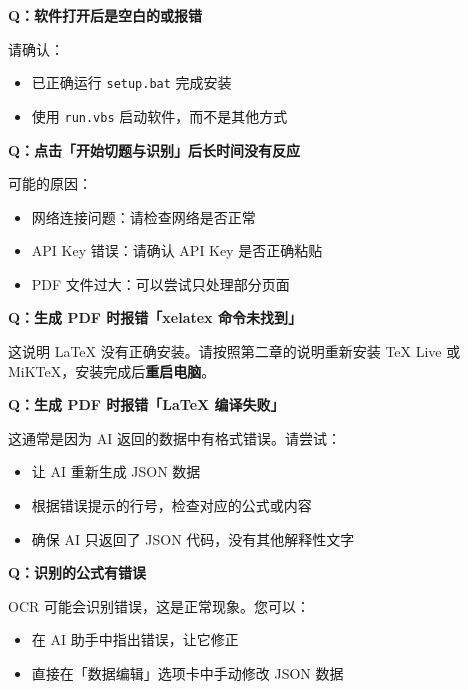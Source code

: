 \documentclass[UTF8,zihao=-4,openany]{ctexbook}
\begin{document}
\begin{QABox}
	\textbf{Q：软件打开后是空白的或报错}

	请确认：
	\begin{itemize}
		\item 已正确运行 \texttt{setup.bat} 完成安装
		\item 使用 \texttt{run.vbs} 启动软件，而不是其他方式
	\end{itemize}
\end{QABox}

\begin{QABox}
	\textbf{Q：点击「开始切题与识别」后长时间没有反应}

	可能的原因：
	\begin{itemize}
		\item 网络连接问题：请检查网络是否正常
		\item API Key 错误：请确认 API Key 是否正确粘贴
		\item PDF 文件过大：可以尝试只处理部分页面
	\end{itemize}
\end{QABox}

\begin{QABox}
	\textbf{Q：生成 PDF 时报错「xelatex 命令未找到」}

	这说明 LaTeX 没有正确安装。请按照第二章的说明重新安装 TeX Live 或 MiKTeX，安装完成后\textbf{重启电脑}。
\end{QABox}

\begin{QABox}
	\textbf{Q：生成 PDF 时报错「LaTeX 编译失败」}

	这通常是因为 AI 返回的数据中有格式错误。请尝试：
	\begin{itemize}
		\item 让 AI 重新生成 JSON 数据
		\item 根据错误提示的行号，检查对应的公式或内容
		\item 确保 AI 只返回了 JSON 代码，没有其他解释性文字
	\end{itemize}
\end{QABox}

\begin{QABox}
	\textbf{Q：识别的公式有错误}

	OCR 可能会识别错误，这是正常现象。您可以：
	\begin{itemize}
		\item 在 AI 助手中指出错误，让它修正
		\item 直接在「数据编辑」选项卡中手动修改 JSON 数据
	\end{itemize}
\end{QABox}
\end{document}
